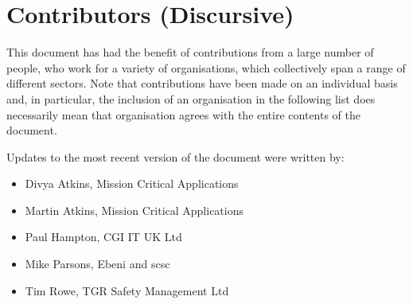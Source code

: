 %
%
\section{Contributors (Discursive)} \label{bkm:contributors}


This document has had the benefit of contributions from a large number of people, who work for a variety of organisations, which collectively span a range of different sectors. Note that contributions  have been made on an individual basis and, in particular, the inclusion of an organisation in the following list does  necessarily mean that organisation agrees with the entire contents of the document.

Updates to the most recent version of the document were written by:
\begin{itemize}
  \item Divya Atkins, Mission Critical Applications
  \item Martin Atkins, Mission Critical Applications
  \item Paul Hampton, CGI IT UK Ltd
  \item Mike Parsons, Ebeni and \gls{scsc}
  \item Tim Rowe, TGR Safety Management Ltd
\end{itemize}

  
